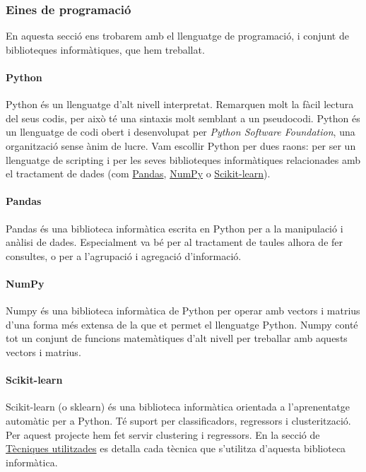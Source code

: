 \documentclass[12pt,a4paper,catalan]{article}
\begin{document}
\newpage
\subsubsection{Eines de programació}
En aquesta secció ens trobarem amb el llenguatge de programació, i conjunt de biblioteques informàtiques, que hem treballat.

\paragraph{Python}
Python \cite{python} és un llenguatge d'alt nivell interpretat. Remarquen molt la fàcil lectura del seus codis, per això té una sintaxis molt semblant a un pseudocodi. Python és un llenguatge de codi obert i desenvolupat per \textit{Python Software Foundation}, una organització sense ànim de lucre. Vam escollir Python per dues raons: per ser un llenguatge de scripting i per les seves biblioteques informàtiques relacionades amb el tractament de dades (com \hyperlink{pandas}{Pandas}, \hyperlink{numpy}{NumPy} o \hyperlink{sklearn}{Scikit-learn}).


\hypertarget{pandas}{
	\paragraph{Pandas}
}
Pandas \cite{pandas} és una biblioteca informàtica escrita en Python per a la manipulació i anàlisi de dades. Especialment va bé per al tractament de taules alhora de fer consultes, o per a l'agrupació i agregació d'informació.

\hypertarget{numpy}{
	\paragraph{NumPy}
}
Numpy \cite{numpy} és una biblioteca informàtica de Python per operar amb vectors i matrius d'una forma més extensa de la que et permet el llenguatge Python. Numpy conté tot un conjunt de funcions matemàtiques d'alt nivell per treballar amb aquests vectors i matrius.

\hypertarget{sklearn}{
	\paragraph{Scikit-learn}
}
Scikit-learn \cite{sklearn} (o sklearn) és una biblioteca informàtica orientada a l'aprenentatge automàtic per a Python. Té suport per classificadors, regressors i clusterització. Per aquest projecte hem fet servir clustering i regressors. En la secció de \hyperlink{tecniquesutilitzades}{Tècniques utilitzades} es detalla cada tècnica que s'utilitza d'aquesta biblioteca informàtica.
\end{document}
